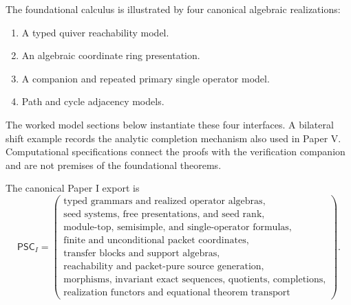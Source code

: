 \begin{definition}
\label{def:reserved-example-slots}
The foundational calculus is illustrated by four canonical algebraic realizations:
\begin{enumerate}[label=(\roman*)]
\item A typed quiver reachability model.
\item An algebraic coordinate ring presentation.
\item A companion and repeated primary single operator model.
\item Path and cycle adjacency models.
\end{enumerate}
The worked model sections below instantiate these four interfaces. A bilateral shift example records the analytic completion mechanism also used in Paper V. Computational specifications connect the proofs with the verification companion and are not premises of the foundational theorems.
\end{definition}

\begin{definition}
\label{def:paper-one-export}
The canonical Paper I export is
\[
\boxed{
\mathsf{PSC}_I=
\left(
\begin{array}{c}
\text{typed grammars and realized operator algebras},\\
\text{seed systems, free presentations, and seed rank},\\
\text{module-top, semisimple, and single-operator formulas},\\
\text{finite and unconditional packet coordinates},\\
\text{transfer blocks and support algebras},\\
\text{reachability and packet-pure source generation},\\
\text{morphisms, invariant exact sequences, quotients, completions},\\
\text{realization functors and equational theorem transport}
\end{array}
\right).
}
\]
\end{definition}



